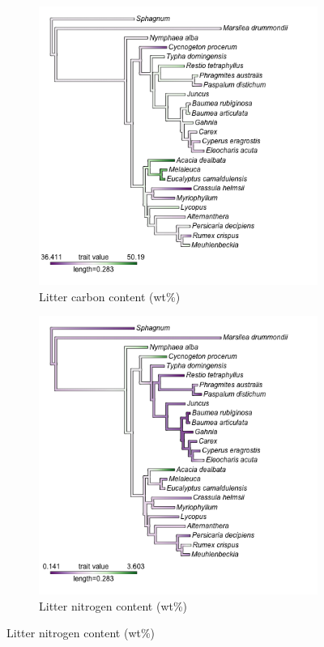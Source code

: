 \documentclass{article}
\begin{document}
\begin{figure}[htb]\ContinuedFloat
    \centering
	\begin{subfigure}[h]{0.7\textwidth}
		\includegraphics[width=\linewidth]{figs/phylo_C.png}
		\caption{Litter carbon content (wt\%)}
		\label{Fig:phyLCC}
	\end{subfigure} 
	\hfill
	\begin{subfigure}[h]{0.7\textwidth}
		\includegraphics[width=\linewidth]{figs/phylo_N.png}
		\caption{Litter nitrogen content (wt\%)}
		\label{Fig:phyLNC}
	\end{subfigure}	
\end{figure}
\end{document}
